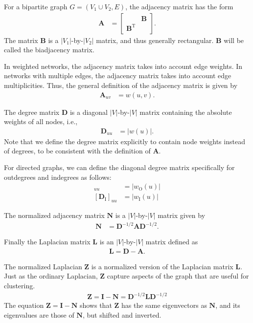 \documentclass{article}
\begin{document}
For a bipartite graph $G=(V_1 \cup V_2, E)$, the adjacency matrix has
the form 
\begin{align}
  \mathbf A &= \left[ \begin{array}{cc} & \mathbf B \\
      \mathbf B^{\mathrm T} & \end{array} \right].
\end{align}
The matrix $\mathbf B$ is a $|V_1|$-by-$|V_2|$ matrix, and thus
generally rectangular. $\mathbf B$ will be called the biadjacency
matrix. 

In weighted networks, the adjacency matrix takes into account edge
weights.  In networks with multiple edges, the adjacency matrix takes
into account edge multiplicities. Thus, the general definition of the
adjacency matrix is given by
\begin{align}
  \mathbf A_{uv} &= w(u, v). 
\end{align}

The degree matrix $\mathbf D$ is a diagonal $|V|$-by-$|V|$ matrix containing
the absolute weights of all nodes, i.e.,
\begin{align}
  \mathbf D_{uu} &= |w(u)|. 
\end{align}
Note that we define the degree matrix explicitly to contain node weights
instead of degrees, to be consistent with the definition of $\mathbf
A$. 

For directed graphs, we can define the diagonal degree matrix
specifically for outdegrees and indegrees as follows:
\begin{align}
  [\mathbf D_{\mathrm O}]_{uu} &= |w_{\mathrm O}(u)| \\
  [\mathbf D_{\mathrm I}]_{uu} &= |w_{\mathrm I}(u)| 
\end{align}

The normalized adjacency matrix $\mathbf N$ is a $|V|$-by-$|V|$ matrix
given by
\begin{align}
  \mathbf N &= \mathbf D^{-1/2} \mathbf A \mathbf D^{-1/2}. 
\end{align}

Finally the Laplacian matrix $\mathbf L$ is an $|V|$-by-$|V|$ matrix
defined as
\begin{align}
  \mathbf L = \mathbf D - \mathbf A. 
\end{align}


The normalized Laplacian $\mathbf Z$ is a normalized version of the Laplacian matrix
$\mathbf L$.  Just as the ordinary Laplacian, $\mathbf Z$ capture
aspects of the graph that are useful for clustering. 
\begin{align}
  \mathbf Z = \mathbf I - \mathbf N = \mathbf D^{-1/2} \mathbf L \mathbf
  D^{-1/2}
\end{align}
The equation $\mathbf Z = \mathbf I - \mathbf N$ shows that $\mathbf Z$
has the same eigenvectors as $\mathbf N$, and its eigenvalues are those
of $\mathbf N$, but shifted and inverted. 
\end{document}

